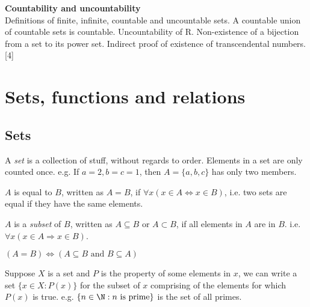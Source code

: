 \documentclass[a4paper]{article}
\begin{document}
{  \vspace{10pt}
  \noindent\textbf{Countability and uncountability}\\
  Definitions of finite, infinite, countable and uncountable sets. A countable union of countable sets is countable. Uncountability of R. Non-existence of a bijection from a set to its power set. Indirect proof of existence of transcendental numbers.\hspace*{\fill}[4]}

  \tableofcontents
  \newpage
  \section{Sets, functions and relations}
  \subsection{Sets}
  \begin{defi}[Set]
    A \emph{set} is a collection of stuff, without regards to order. Elements in a set are only counted once. e.g. If $a = 2, b = c = 1$, then $A = \{a, b, c\}$ has only two members.
  \end{defi}

  \begin{defi}
    $A$ is equal to $B$, written as $A = B$, if $\forall x(x\in A \Leftrightarrow x\in B)$, i.e. two sets are equal if they have the same elements.
  \end{defi}

  \begin{defi}[Subsets]
    $A$ is a \emph{subset} of $B$, written as $A\subseteq B$ or $A\subset B$, if all elements in $A$ are in $B$. i.e. $\forall x(x\in A\Rightarrow x\in B)$.
  \end{defi}

  \begin{thm}
    $(A=B)\Leftrightarrow (A\subseteq B \text{ and }B\subseteq A)$
  \end{thm}

  Suppose $X$ is a set and $P$ is the property of some elements in $x$, we can write a set $\{x\in X:P(x)\}$ for the subset of $x$ comprising of the elements for which $P(x)$ is true. e.g. $\{n\in \N : n \text{ is prime}\}$ is the set of all primes.
\end{document}
